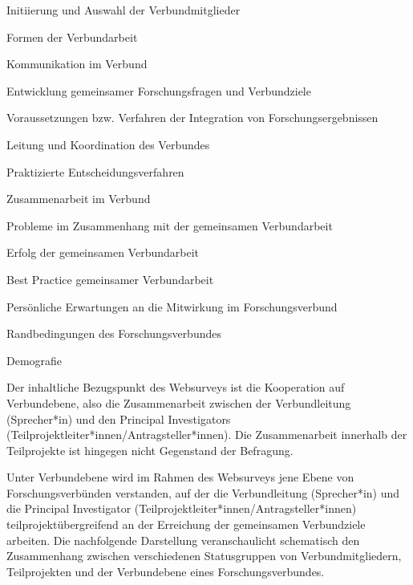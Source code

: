 \documentclass[a4paper,10pt,twoside]{article}
\begin{document}
\begin{center}
\begin{tcolorbox}[width=10.7cm, sharp corners, colback=DZHWblue!20,
before={\captionof{figure}{Themenblöcke des Websurveys}},
after={}]

\begin{packed_enum}[itemsep=0pt, parsep=0pt]

    \item Initiierung und Auswahl der Verbundmitglieder
    \item Formen der Verbundarbeit
    \item Kommunikation im Verbund
    \item Entwicklung gemeinsamer Forschungsfragen und Verbundziele
    \item Voraussetzungen bzw. Verfahren der Integration von Forschungsergebnissen
    \item Leitung und Koordination des Verbundes
    \item Praktizierte Entscheidungsverfahren
    \item Zusammenarbeit im Verbund
    \item Probleme im Zusammenhang mit der gemeinsamen Verbundarbeit
    \item Erfolg der gemeinsamen Verbundarbeit
    \item Best Practice gemeinsamer Verbundarbeit
    \item Persönliche Erwartungen an die Mitwirkung im Forschungsverbund
    \item Randbedingungen des Forschungsverbundes
    \item Demografie

\end{packed_enum}

\end{tcolorbox}
\end{center}

\vspace{3 mm}

Der inhaltliche Bezugspunkt des Websurveys ist die Kooperation auf Verbundebene, also die Zusammenarbeit zwischen der Verbundleitung (Sprecher*in) und den Principal Investigators (Teilprojektleiter*innen/Antragsteller*innen). Die Zusammenarbeit innerhalb der Teilprojekte ist hingegen nicht Gegenstand der Befragung.

\vspace{3 mm}

Unter Verbundebene wird im Rahmen des Websurveys jene Ebene von Forschungsverbünden verstanden, auf der die Verbundleitung (Sprecher*in) und die Principal Investigator (Teilprojektleiter*innen/Antragsteller*innen) teilprojektübergreifend an der Erreichung der gemeinsamen Verbundziele arbeiten. Die nachfolgende Darstellung veranschaulicht schematisch den Zusammenhang zwischen verschiedenen Statusgruppen von Verbundmitgliedern, Teilprojekten und der Verbundebene eines Forschungsverbundes.
\end{document}
